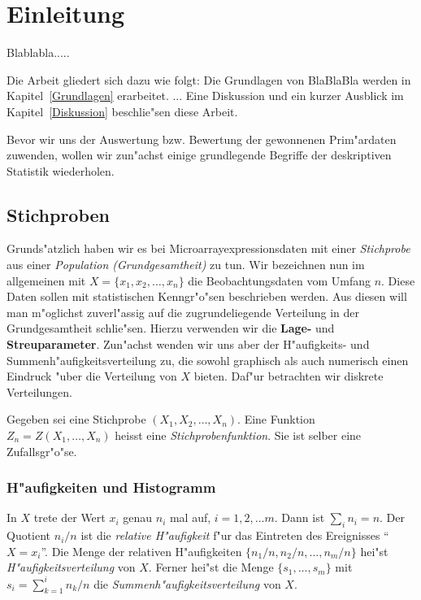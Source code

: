 
\chapter{Einleitung}\label{Einleitung}

Blablabla.....

\medskip
Die Arbeit gliedert sich dazu wie folgt: Die Grundlagen von BlaBlaBla 
werden in Kapitel~\ref{Grundlagen} erarbeitet. 
...
Eine Diskussion und ein kurzer Ausblick im
Kapitel~\ref{Diskussion} beschlie"sen diese Arbeit.

Bevor wir uns der Auswertung bzw. Bewertung der gewonnenen Prim"ardaten zuwenden, wollen wir zun"achst einige grundlegende Begriffe der deskriptiven Statistik wiederholen.
\section{Stichproben}

Grunds"atzlich haben wir es bei Microarrayexpressionsdaten mit einer {\em Stichprobe} aus einer {\em Population (Grundgesamtheit)} zu tun.   
Wir bezeichnen nun im allgemeinen mit $X=\{x_1,x_2,\ldots,x_n\}$ die Beobachtungsdaten vom Umfang $n$. 
Diese Daten sollen mit statistischen Kenngr"o"sen beschrieben werden. Aus diesen will man m"oglichst zuverl"assig auf die zugrundeliegende Verteilung in der Grundgesamtheit schlie"sen. Hierzu verwenden wir die {\bf Lage-} und {\bf Streuparameter}. Zun"achst wenden wir uns aber der H"aufigkeits- und Summenh"aufigkeitsverteilung zu, die sowohl graphisch als auch numerisch einen Eindruck "uber die Verteilung von $X$ bieten. Daf"ur betrachten wir diskrete Verteilungen.

Gegeben sei eine Stichprobe $(X_1,X_2,\ldots,X_n)$. Eine Funktion $Z_n=Z(X_1,\ldots,X_n)$ heisst eine {\em Stichprobenfunktion}. Sie ist selber eine Zufallsgr"o"se.

\subsection{H"aufigkeiten und Histogramm}
In $X$ trete der Wert $x_i$ genau $n_i$ mal auf, $i=1,2,\ldots m$. Dann ist $\sum_i n_i = n$. Der Quotient $n_i/n$ ist die {\em relative H"aufigkeit} f"ur das Eintreten des Ereignisses ``$X=x_i$''.
Die Menge der relativen H"aufigkeiten $\{n_1/n,n_2/n,\ldots, n_m/n\}$ hei"st {\em H"aufigkeitsverteilung} von $X$. Ferner hei"st die Menge $\{s_1,\ldots,s_m\}$ mit $s_i=\sum_{k=1}^{i}n_k/n$ die {\em Summenh"aufigkeitsverteilung} von $X$.

